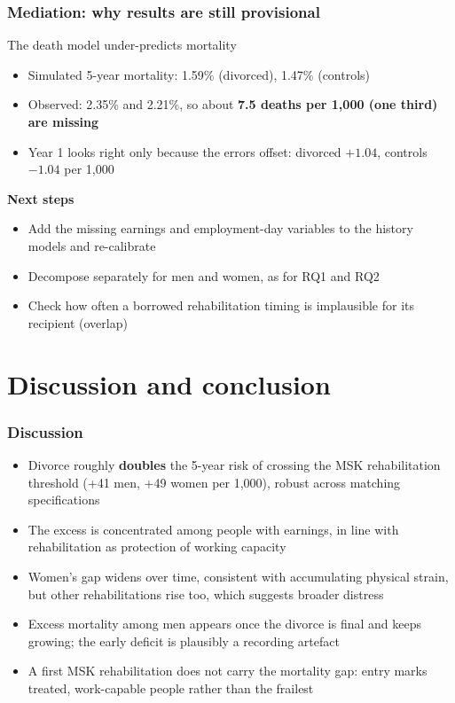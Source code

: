 \documentclass[t,20pt]{beamer}
\newcommand{\hl}[1]{\textcolor{BiBViolett}{\textbf{#1}}}           %
\begin{document}
\begin{bibframe}
  \frametitle{Mediation: why results are still provisional}
  \begin{alertblock}{The death model under-predicts mortality}
    \begin{itemize}
      \item Simulated 5-year mortality: 1.59\% (divorced), 1.47\% (controls)
      \item Observed: 2.35\% and 2.21\%, so about \hl{7.5 deaths per 1,000 (one third) are missing}
      \item Year 1 looks right only because the errors offset: divorced $+1.04$, controls $-1.04$ per 1,000
    \end{itemize}
  \end{alertblock}
  \vspace{0.3cm}
  \textbf{Next steps}
  \begin{itemize}
    \item Add the missing earnings and employment-day variables to the history models and re-calibrate
    \item Decompose separately for men and women, as for RQ1 and RQ2
    \item Check how often a borrowed rehabilitation timing is implausible for its recipient (overlap)
  \end{itemize}
\end{bibframe}

\section{Discussion and conclusion}

\begin{bibframe}
  \frametitle{Discussion}
  \begin{itemize}
    \item Divorce roughly \hl{doubles} the 5-year risk of crossing the MSK rehabilitation threshold (+41 men, +49 women per 1,000), robust across matching specifications
    \item The excess is concentrated among people with earnings, in line with rehabilitation as protection of working capacity
    \item Women's gap widens over time, consistent with accumulating physical strain, but other rehabilitations rise too, which suggests broader distress
    \item Excess mortality among men appears once the divorce is final and keeps growing; the early deficit is plausibly a recording artefact
    \item A first MSK rehabilitation does not carry the mortality gap: entry marks treated, work-capable people rather than the frailest
  \end{itemize}
\end{bibframe}
\end{document}
